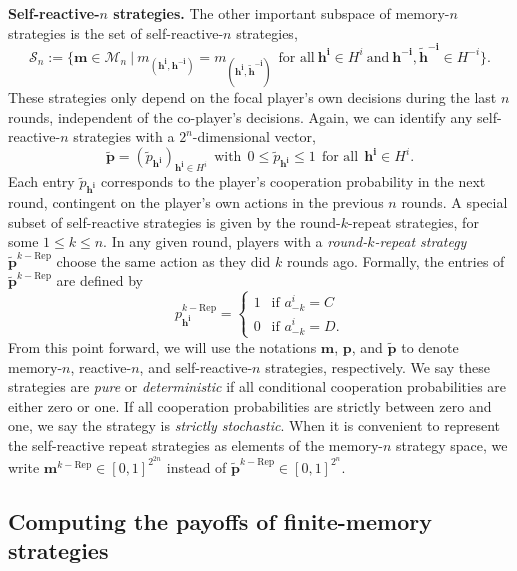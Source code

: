 \documentclass[11pt]{article}
\theoremstyle{plainCl1}
\theoremstyle{plainCl2}
\begin{document}
\noindent
{\bfseries Self-reactive-$n$ strategies.}
The other important subspace of memory-$n$ strategies is the set of self-reactive-$n$ strategies, 
\begin{equation}
\mathcal{S}_n:=\Big\{ \mathbf{m}\!\in\!\mathcal{M}_n ~\Big|~ m_{(\mathbf{h^i},\mathbf{h^{-i}})}\!=\!m_{(\mathbf{h^i},\mathbf{\tilde h^{-i}})}~~\text{for all}~\mathbf{h^i}\!\in\!H^i~\text{and}~\mathbf{h^{-i}},\mathbf{\tilde h^{-i}}\!\in\!H^{-i}\Big\}.
\end{equation}
These strategies only depend on the focal player's own decisions during the last $n$ rounds, independent of the co-player's decisions. 
Again, we can identify any self-reactive-$n$ strategies with a $2^n$-dimensional vector, 
\begin{equation}
\mathbf{\tilde{p}} = (\tilde{p}_\mathbf{h^{i}})_{\mathbf{h^{i}} \in H^i}  ~~\text{with}~~ 0\!\le\!\tilde p_\mathbf{h^i}\!\le\!1 ~~\text{for all}~~ \mathbf{h^i}\!\in\! H^i.
\end{equation}
Each entry $\tilde{p}_{\mathbf{h^{i}}}$ corresponds to the player's cooperation
probability in the next round, contingent on the player's own actions in
the previous $n$ rounds.
A special subset of self-reactive strategies is given by the round-$k$-repeat strategies, for some $1\le
k\le n$. 
In any given round, players with a {\it round-$k$-repeat strategy} $\mathbf{\tilde p}^{k-\text{Rep}}$ choose the same action as they did $k$ rounds ago. 
Formally, the entries of $\mathbf{\tilde p}^{k-\text{Rep}}$ are defined by
$$
p^{k-\text{Rep}}_\mathbf{h^i} =
\left\{
\begin{array}{l}
1~~ \text{ if } a^i_{-k}\!=\!C\\[0.1cm]
0~~ \text{ if } a^i_{-k}\!=\!D.
\end{array}
\right.
$$
From this point forward, we will use the notations $\mathbf{m}$, $\mathbf{p}$,
and $\mathbf{\tilde{p}}$ to denote memory-$n$, reactive-$n$, and
self-reactive-$n$ strategies, respectively. 
We say these strategies are {\it pure} or {\it deterministic} if all conditional cooperation probabilities are either zero or one. 
If all cooperation probabilities are strictly between zero and one, we say the strategy is {\it strictly stochastic}. 
When it is convenient to represent the self-reactive repeat strategies as elements of the memory-$n$ strategy space, we write $\mathbf{m}^{k-\text{Rep}}\!\in\![0,1]^{2^{2n}}$ instead of $\mathbf{\tilde p}^{k-\text{Rep}}\!\in\![0,1]^{2^n}$.


\subsection{Computing the payoffs of finite-memory strategies} \label{Sec:PayoffComputation}
\end{document}
